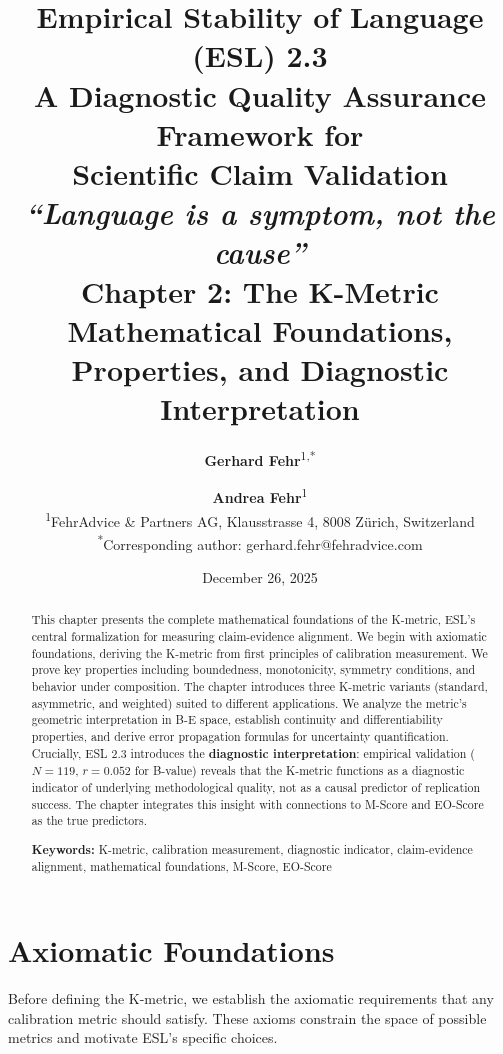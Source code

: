 \documentclass[11pt,a4paper]{article}
\title{%
    \Large \textbf{Empirical Stability of Language (ESL) 2.3} \\[0.5em]
    \large A Diagnostic Quality Assurance Framework for \\
    Scientific Claim Validation \\[0.3em]
    \small \textit{``Language is a symptom, not the cause''} \\[1em]
    \LARGE \textbf{Chapter 2: The K-Metric} \\[0.3em]
    \large Mathematical Foundations, Properties, and Diagnostic Interpretation
}
\author{%
    \textbf{Gerhard Fehr}\textsuperscript{1,*} \and \textbf{Andrea Fehr}\textsuperscript{1} \\[0.5em]
    \textsuperscript{1}FehrAdvice \& Partners AG, Klausstrasse 4, 8008 Zürich, Switzerland \\[0.3em]
    \textsuperscript{*}Corresponding author: gerhard.fehr@fehradvice.com
}
\date{December 26, 2025}
\theoremstyle{remark}
\begin{document}
\maketitle


\begin{abstract}
\noindent
This chapter presents the complete mathematical foundations of the K-metric, ESL's central formalization for measuring claim-evidence alignment. We begin with axiomatic foundations, deriving the K-metric from first principles of calibration measurement. We prove key properties including boundedness, monotonicity, symmetry conditions, and behavior under composition. The chapter introduces three K-metric variants (standard, asymmetric, and weighted) suited to different applications. We analyze the metric's geometric interpretation in B-E space, establish continuity and differentiability properties, and derive error propagation formulas for uncertainty quantification. Crucially, ESL 2.3 introduces the \textbf{diagnostic interpretation}: empirical validation ($N = 119$, $r = 0.052$ for B-value) reveals that the K-metric functions as a diagnostic indicator of underlying methodological quality, not as a causal predictor of replication success. The chapter integrates this insight with connections to M-Score and EO-Score as the true predictors.

\vspace{0.5em}
\noindent\textbf{Keywords:} K-metric, calibration measurement, diagnostic indicator, claim-evidence alignment, mathematical foundations, M-Score, EO-Score
\end{abstract}

\tableofcontents
\newpage


\section{Axiomatic Foundations}
\label{sec:axioms}

Before defining the K-metric, we establish the axiomatic requirements that any calibration metric should satisfy. These axioms constrain the space of possible metrics and motivate ESL's specific choices.
\end{document}
